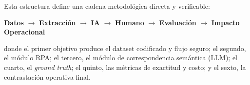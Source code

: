 Esta estructura define una cadena metodológica directa y verificable:
\begin{center}
\textbf{Datos} $\longrightarrow$ \textbf{Extracción} $\longrightarrow$ \textbf{IA} $\longrightarrow$ \textbf{Humano} $\longrightarrow$ \textbf{Evaluación} $\longrightarrow$ \textbf{Impacto Operacional}
\end{center}
donde el primer objetivo produce el dataset codificado y flujo seguro; el segundo, el módulo RPA; el tercero, el módulo de correspondencia semántica (LLM); el cuarto, el \textit{ground truth}; el quinto, las métricas de exactitud y costo; y el sexto, la contrastación operativa final.


